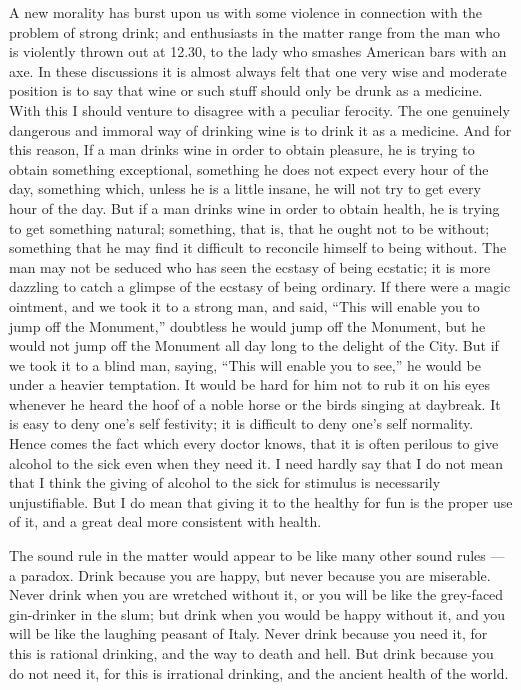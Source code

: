 
A new morality has burst upon us with some violence in connection with the problem of strong drink; and enthusiasts in the matter range from the man who is violently thrown out at 12.30, to the lady who smashes American bars with an axe. In these discussions it is almost always felt that one very wise and moderate position is to say that wine or such stuff should only be drunk as a medicine. With this I should venture to disagree with a peculiar ferocity. The one genuinely dangerous and immoral way of drinking wine is to drink it as a medicine. And for this reason, If a man drinks wine in order to obtain pleasure, he is trying to obtain something exceptional, something he does not expect every hour of the day, something which, unless he is a little insane, he will not try to get every hour of the day. But if a man drinks wine in order to obtain health, he is trying to get something natural; something, that is, that he ought not to be without; something that he may find it difficult to reconcile himself to being without. The man may not be seduced who has seen the ecstasy of being ecstatic; it is more dazzling to catch a glimpse of the ecstasy of being ordinary. If there were a magic ointment, and we took it to a strong man, and said, “This will enable you to jump off the Monument,” doubtless he would jump off the Monument, but he would not jump off the Monument all day long to the delight of the City. But if we took it to a blind man, saying, “This will enable you to see,” he would be under a heavier temptation. It would be hard for him not to rub it on his eyes whenever he heard the hoof of a noble horse or the birds singing at daybreak. It is easy to deny one’s self festivity; it is difficult to deny one’s self normality. Hence comes the fact which every doctor knows, that it is often perilous to give alcohol to the sick even when they need it. I need hardly say that I do not mean that I think the giving of alcohol to the sick for stimulus is necessarily unjustifiable. But I do mean that giving it to the healthy for fun is the proper use of it, and a great deal more consistent with health.

The sound rule in the matter would appear to be like many other sound rules — a paradox. Drink because you are happy, but never because you are miserable. Never drink when you are wretched without it, or you will be like the grey-faced gin-drinker in the slum; but drink when you would be happy without it, and you will be like the laughing peasant of Italy. Never drink because you need it, for this is rational drinking, and the way to death and hell. But drink because you do not need it, for this is irrational drinking, and the ancient health of the world.

